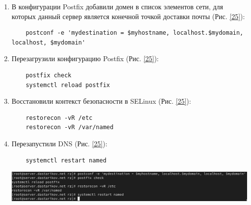 \begin{enumerate}
\item В конфигурации Postfix добавили домен в список элементов сети, для которых данный сервер является конечной точкой доставки почты (Рис. \ref{25}):
  \begin{verbatim}
    postconf -e 'mydestination = $myhostname, localhost.$mydomain, localhost, $mydomain'
  \end{verbatim}
\item Перезагрузили конфигурацию Postfix (Рис. \ref{25}):
  \begin{verbatim}
    postfix check
    systemctl reload postfix
  \end{verbatim}
\item Восстановили контекст безопасности в SELinux (Рис. \ref{25}):
  \begin{verbatim}
    restorecon -vR /etc
    restorecon -vR /var/named
  \end{verbatim}
\item Перезапустили DNS (Рис. \ref{25}):
  \begin{verbatim}
    systemctl restart named
  \end{verbatim}
\begin{center}
    \centering
    \includegraphics[width=\textwidth]{../images/image25.png}
    \label{25}
\end{center}


\end{enumerate}
